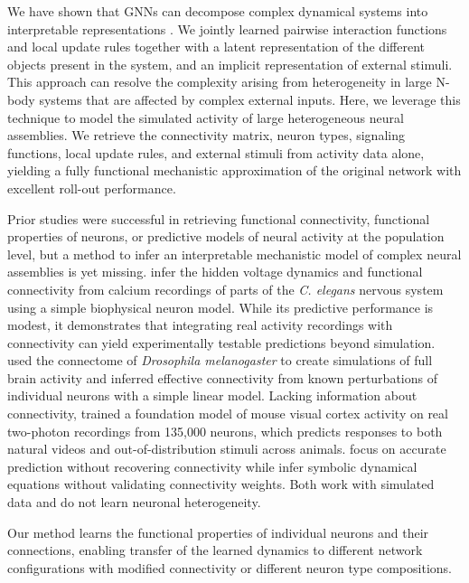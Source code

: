 \documentclass[10pt,twocolumn]{article}
\begin{document}
We have shown that GNNs can decompose complex dynamical systems into interpretable representations \citep{allier_decomposing_2024}.  We jointly learned pairwise interaction functions and local update rules together with a latent representation of the different objects present in the system, and an implicit representation of external stimuli.  This approach can resolve the complexity arising from heterogeneity in large N-body systems that are affected by complex external inputs.  Here, we leverage this technique to model the simulated activity of large heterogeneous neural assemblies.  We retrieve the connectivity matrix, neuron types, signaling functions, local update rules, and external stimuli from activity data alone, yielding a fully functional mechanistic approximation of the original network with excellent roll-out performance.

Prior studies were successful in retrieving functional connectivity, functional properties of neurons, or predictive models of neural activity at the population level, but a method to infer an interpretable mechanistic model of complex neural assemblies is yet missing. \citet{mi_connectome-constrained_2021} infer the hidden voltage dynamics and functional connectivity from calcium recordings of parts of the \emph{C. elegans} nervous system using a simple biophysical neuron model.  While its predictive performance is modest, it demonstrates that integrating real activity recordings with connectivity can yield experimentally testable predictions beyond simulation.  \citet{pospisil_fly_2024} used the connectome of \emph{Drosophila melanogaster} \citep{dorkenwald_neuronal_2024} to create simulations of full brain activity and inferred effective connectivity from known perturbations of individual neurons with a simple linear model.  Lacking information about connectivity, \citet{wang_foundation_2025} trained a foundation model of mouse visual cortex activity on real two-photon recordings from 135,000 neurons, which predicts responses to both natural videos and out-of-distribution stimuli across animals.
\citet{prasse_predicting_2022} focus on accurate prediction without recovering connectivity while \citet{yu_discovering_2025} infer symbolic dynamical equations without validating connectivity weights. Both work with simulated data and do not learn neuronal heterogeneity.

Our method learns the functional properties of individual neurons and their connections, enabling transfer of the learned dynamics to different network configurations with modified connectivity or different neuron type compositions.
\end{document}

